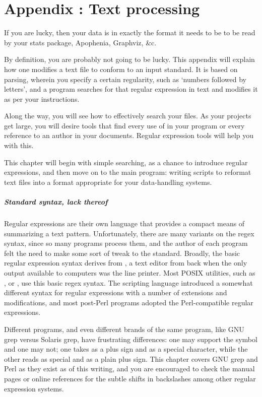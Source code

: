 \renewcommand\thechapter{\Alph{chapter}}
\setcounter{chapter}{1}
\setcounter{section}{0}
\setcounter{subsection}{0}
\chapter{Appendix \thechapter: Text processing} \label{textappendix}

If you are lucky, then your data is in exactly the format it needs to be
to be read by your stats package, Apophenia, Graphviz, \&c.

By definition, you are probably not going to be lucky. This appendix will
explain how one modifies a text file to conform to an input standard. It
is based on  parsing, wherein you specify a
certain regularity, such as `numbers followed by letters', and a program
searches for that regular expression in text and modifies it as per
your instructions.

Along the way, you will see how to effectively search your files. As
your projects get large, you will desire tools that find every use of
 in your program or every reference to an author in
your documents. Regular expression tools will help you with this.

This chapter will begin with simple searching, as a chance to introduce
regular expressions, and then move on to the main program: writing
scripts to reformat text files into a format appropriate for your
data-handling systems.

\paragraph{Standard syntax, lack thereof}
Regular expressions are their own language that provides a compact means
of summarizing a text pattern. Unfortunately, there are many variants on the
regex syntax, since so many programs process them, and the author of
each program felt the need to make some sort of tweak to the standard.
Broadly, the basic regular expression syntax derives from , a
text editor from back when the only output available to computers was
the line printer. Most POSIX utilities, such as , 
 or , use this basic regex syntax. The scripting language
 introduced a somewhat different syntax for regular
expressions with a number of extensions and modifications, and most
post-Perl programs adopted the Perl-compatible regular expressions. 

Different programs, and even different brands of the same
program, like GNU grep versus Solaris grep, have frustrating
differences: one may support the  symbol and one may not; 
one takes \ci{+} as a plus sign and  \ci{\textbs+} as a special
character, while the other reads \ci{+} as special and \ci{\textbs+}
as a plain plus sign. This chapter covers GNU grep and Perl as they exist as
of this writing, and you are encouraged to check the manual pages or
online references for the subtle shifts in backslashes among other
regular expression systems.

